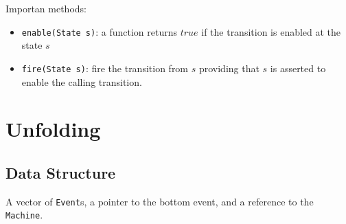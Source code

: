 \documentclass{llncs}
\begin{document}
\begin{enumerate}
\begin{itemize}
	\end{itemize}
	
\noindent	
Importan methods:
	\begin{itemize}
	\item
		\verb!enable(State s)!: a function returns $true$ if the transition is enabled at the state $s$ 
	\item
		\verb!fire(State s)!: fire the transition from $s$ providing that $s$ is asserted to enable the calling transition.
	\end{itemize}
\end{enumerate}

\section{Unfolding}
\label{s:unf}
\subsection{Data Structure}
	A vector of \verb!Event!s, a pointer to the bottom event, and a reference to the \verb!Machine!.
\end{document}

